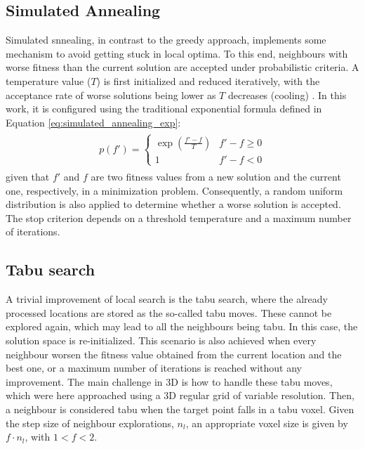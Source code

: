 \subsection{Simulated Annealing}

Simulated snnealing, in contrast to the greedy approach, implements some mechanism to avoid getting stuck in local optima. To this end, neighbours with worse fitness than the current solution are accepted under probabilistic criteria. A temperature value ($T$) is first initialized and reduced iteratively, with the acceptance rate of worse solutions being lower as $T$ decreases (cooling) \cite{wieckowski_finding_2020}. In this work, it is configured using the traditional exponential formula defined in Equation \ref{eq:simulated_annealing_exp}: 
\begin{gather}
    \label{eq:simulated_annealing_exp}
    \begin{aligned}
        p(f') =
        \begin{cases}
            \exp(\frac{f'-f}{T}) &f'-f \geq 0\\
            1 &f'-f < 0
        \end{cases}
    \end{aligned}
\end{gather}
given that $f'$ and $f$ are two fitness values from a new solution and the current one, respectively, in a minimization problem. Consequently, a random uniform distribution is also applied to determine whether a worse solution is accepted. The stop criterion depends on a threshold temperature and a maximum number of iterations.

\subsection{Tabu search}

A trivial improvement of local search is the tabu search, where the already processed locations are stored as the so-called tabu moves. These cannot be explored again, which may lead to all the neighbours being tabu. In this case, the solution space is re-initialized. This scenario is also achieved when every neighbour worsen the fitness value obtained from the current location and the best one, or a maximum number of iterations is reached without any improvement. The main challenge in 3D is how to handle these tabu moves, which were here approached using a 3D regular grid of variable resolution. Then, a neighbour is considered tabu when the target point falls in a tabu voxel. Given the step size of neighbour explorations, $n_l$, an appropriate voxel size is given by $f \cdot n_l$, with $1 < f < 2$.

